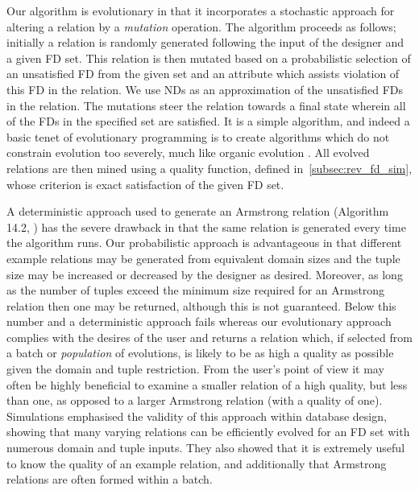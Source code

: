 \smallskip

Our algorithm is evolutionary in that it incorporates a stochastic approach
for altering a relation by a {\em mutation} operation.
 The algorithm proceeds as
follows; initially a relation is randomly generated following
the input of the designer and a given FD set. This relation is then
 mutated based on a probabilistic selection of an unsatisfied FD  from the
given set and an attribute which assists violation of this FD in the relation.
We use NDs as an
approximation of the unsatisfied FDs in the relation. 
The mutations steer the relation
towards a final state wherein all of the FDs in the specified set are
satisfied. It is a simple algorithm, and indeed a basic tenet 
of evolutionary programming is to create algorithms 
which do not constrain evolution too severely,
 much like organic evolution \cite{bs93}. All evolved relations are then mined 
using a quality function, defined in~\ref{subsec:rev_fd_sim}, whose criterion is exact satisfaction of the given FD set. 

\smallskip

A deterministic approach used to generate an Armstrong relation
(Algorithm 14.2, \cite{Mann92}) has the severe drawback
 in that the same relation
is generated every time the algorithm runs.  Our probabilistic
approach is advantageous in that different example relations may
be generated from equivalent domain sizes and the tuple size may be
increased or decreased by the designer as desired. Moreover, as long as 
the number of tuples exceed the minimum size required for an Armstrong relation
 \cite{bdfs84,mr86} then one may 
be returned, although this is not guaranteed.  Below this number and a
deterministic approach fails 
 whereas our evolutionary approach complies with the desires of the user
and returns a relation which, if selected from a batch or {\em 
population} of evolutions, is likely to be as high a quality
as possible given the domain and tuple restriction.  From the user's
point of view it may often be highly beneficial to examine a smaller
relation of a high quality, but less than one, as opposed to a larger Armstrong
relation (with a quality of one).
Simulations
emphasised the validity of this approach within database
design, showing that many varying relations can be efficiently
evolved for an FD set with numerous domain and tuple inputs.
 They also showed that it is extremely useful to know the quality of an
 example relation, and additionally that Armstrong
relations are often formed within a batch. 



